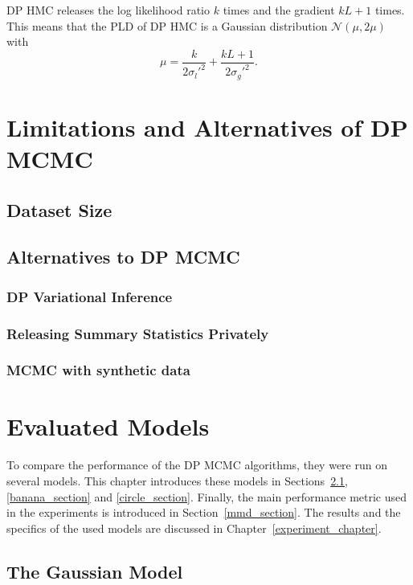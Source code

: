 \documentclass[english,twoside,openright]{HYgraduMLDS}
\newcommand{\caln}{{\mathcal{N}}}
\begin{document}
DP HMC releases the log likelihood ratio \(k\) times and the gradient
\(kL + 1\) times. This means that the PLD of DP HMC is a Gaussian distribution
\(\caln(\mu, 2\mu)\) with
\[
  \mu = \frac{k}{2\sigma_{l}'^{2}} + \frac{kL + 1}{2\sigma_{g}'^{2}}.
\]

\chapter{Limitations and Alternatives of DP MCMC}

\section{Dataset Size}

\section{Alternatives to DP MCMC}

\subsection{DP Variational Inference}
\subsection{Releasing Summary Statistics Privately}
\subsection{MCMC with synthetic data}

\chapter{Evaluated Models}

To compare the performance of the DP MCMC algorithms, they were run on
several models. This chapter introduces these models in Sections~\ref{gauss_model},
\ref{banana_section} and \ref{circle_section}. Finally, the main performance
metric used in the experiments is introduced in Section~\ref{mmd_section}.
The results and the specifics of the used models are discussed in
Chapter~\ref{experiment_chapter}.

\section{The Gaussian Model}\label{gauss_model}
\end{document}
